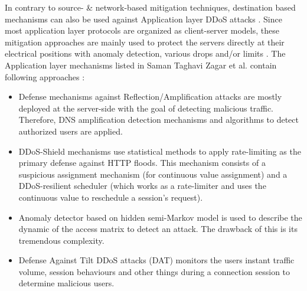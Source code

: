 In contrary to source- \& network-based mitigation techniques, destination based mechanisms can also be used against Application layer DDoS attacks \cite{DDoS-MitigationSurvey}. Since most application layer protocols are organized as client-server models, these mitigation approaches are mainly used to protect the servers directly at their electrical positions with anomaly detection, various drops and/or limits \cite{DDoS-MitigationSurvey}. The Application layer mechanisms listed in Saman Taghavi Zagar et al. contain following approaches \cite{DDoS-MitigationSurvey}:
\begin{itemize}
    \item Defense mechanisms against Reflection/Amplification attacks are mostly deployed at the server-side with the goal of detecting malicious traffic. Therefore, DNS amplification detection mechanisms and algorithms to detect authorized users are applied. 
    \item DDoS-Shield mechanisms use statistical methods to apply rate-limiting as the primary defense against HTTP floods. This mechanism consists of a suspicious assignment mechanism (for continuous value assignment) and a DDoS-resilient scheduler (which works as a rate-limiter and uses the continuous value to reschedule a session's request). 
    \item Anomaly detector based on hidden semi-Markov model is used to describe the dynamic of the access matrix to detect an attack. The drawback of this is its tremendous complexity. 
    \item Defense Against Tilt DDoS attacks (DAT) monitors the users instant traffic volume, session behaviours and other things during a connection session to determine malicious users. 
\end{itemize}
    
